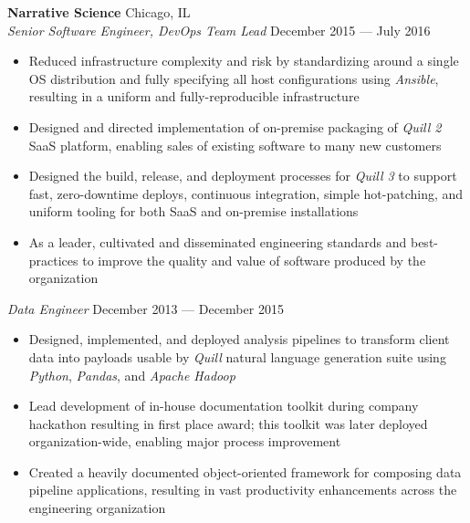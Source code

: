 \documentclass[line,margin]{res}
\begin{document}
\begin{resume}
    \textbf{Narrative Science} \hfill Chicago, IL \\
    \textit{Senior Software Engineer, DevOps Team Lead}
    \hfill December 2015 --- July 2016
        \begin{itemize}  \itemsep -2pt
            \item Reduced infrastructure complexity and risk by standardizing
                around a single OS distribution and fully specifying all host
                configurations using \textit{Ansible}, resulting in a uniform
                and fully-reproducible infrastructure
            \item Designed and directed implementation of on-premise packaging
                of \textit{Quill 2} SaaS platform, enabling sales of existing
                software to many new customers
            \item Designed the build, release, and deployment processes for
                \textit{Quill 3} to support fast, zero-downtime deploys,
                continuous integration, simple hot-patching, and uniform
                tooling for both SaaS and on-premise installations
            \item As a leader, cultivated and disseminated engineering
                standards and best-practices to improve the quality and value
                of  software produced by the organization
        \end{itemize}
     \textit{Data Engineer} \hfill December 2013 --- December 2015
        \begin{itemize} \itemsep -2pt
            \item Designed, implemented, and deployed     analysis pipelines to
                transform client data into payloads usable by \textit{Quill}
                natural language generation suite using \textit{Python},
                \textit{Pandas}, and \textit{Apache Hadoop}
            \item Lead development of in-house documentation toolkit during
                company hackathon resulting in first place award; this toolkit
                was later deployed organization-wide, enabling major process
                improvement
            \item Created a heavily documented object-oriented framework for
                composing data pipeline applications, resulting in vast
                productivity enhancements across the engineering organization
        \end{itemize}


\end{resume}
\end{document}
